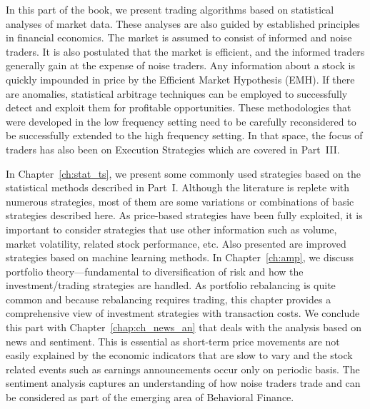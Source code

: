 
In this part of the book, we present trading algorithms based on statistical analyses of market data. These analyses are also guided by established principles in financial economics. The market is assumed to consist of informed and noise traders. It is also postulated that the market is efficient, and the informed traders generally gain at the expense of noise traders. Any information about a stock is quickly impounded in price by the Efficient Market Hypothesis (EMH). If there are anomalies, statistical arbitrage techniques can be employed to successfully detect and exploit them for profitable opportunities. These methodologies that were developed in the low frequency setting need to be carefully reconsidered to be successfully extended to the high frequency setting. In that space, the focus of traders has also been on Execution Strategies which are covered in Part~III.


In Chapter~\ref{ch:stat_ts}, we present some commonly used strategies based on the statistical methods described in Part~I. Although the literature is replete with numerous strategies, most of them are some variations or combinations of basic strategies described here. As price-based strategies have been fully exploited, it is important to consider strategies that use other information such as volume, market volatility, related stock performance, etc. Also presented are improved strategies based on machine learning methods. In Chapter~\ref{ch:amp}, we discuss portfolio theory---fundamental to diversification of risk and how the investment/trading strategies are handled. As portfolio rebalancing is quite common and because rebalancing requires trading, this chapter provides a comprehensive view of investment strategies with transaction costs. We conclude this part with Chapter~\ref{chap:ch_news_an} that deals with the analysis based on news and sentiment. This is essential as short-term price movements are not easily explained by the economic indicators that are slow to vary and the stock related events such as earnings announcements occur only on periodic basis. The sentiment analysis captures an understanding of how noise traders trade and can be considered as part of the emerging area of Behavioral Finance. 